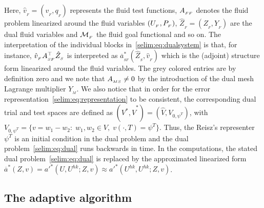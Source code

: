 Here, $\hat{v}_{_{F}} = (v_{_{F}}, q_{_{F}})$ represents the fluid
test functions, $A_{_{FF}}$ denotes the fluid problem linearized around the
fluid variables $(U_{_{F}},P_{_{F}})$, $\hat{Z}_{_{F}} = (Z_{_{F}}, Y_{_{F}})$
are the dual fluid variables and $\mathcal{M}_{_{F}}$ the fluid goal functional
and so on. The interpretation of the individual blocks
in~\eqref{selim:eq:dualsystem} is that, for instance,
$\hat{v}_{_{F}}A_{_{SF}}^{\top}\hat{Z}_{_{S}} $ is interpreted as
$\overline{a}^*_{_{SF}}(\hat{Z}_{_{S}}, \hat{v}_{_{F}})$ which is the
(adjoint) structure form linearized around the fluid variables.  The
grey colored entries are by definition zero and we note that $A_{_{MS}}
\neq 0$ by the introduction of the dual mesh Lagrange multiplier
$Y_{_{M}}$. We also notice that in order for the error
representation~\eqref{selim:eq:representation} to be consistent, the
corresponding dual trial and test spaces are defined as $(V^*,
\hat{V}^*) = (\hat{V}, V_{0, \psi^T})$, with $V_{0,\psi^T} =
\{v=w_1-w_2:\;w_1,w_2\in V , \;v(\cdot, T) = \psi^T \}$. Thus, the
Reisz's representer $\psi^T$ is an initial condition in the dual
problem and the dual problem~\eqref{selim:eq:dual} runs backwards in
time.  In the computations, the stated dual
problem~\eqref{selim:eq:dual} is replaced by the approximated
linearized form $\overline{a}^{*}(Z, v) = a'^{*}(U,U^{hk}; Z, v)
\approx a'^{*}(U^{hk}, U^{hk}; Z, v) $.

\subsection{The adaptive algorithm}

